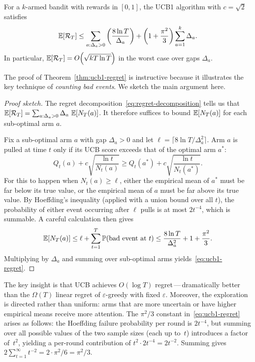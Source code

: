 \begin{theorem}
\label{thm:ucb1-regret}
For a $k$-armed bandit with rewards in $[0,1]$, the UCB1 algorithm with $c=\sqrt{2}$ satisfies
\begin{equation}
\label{eq:ucb1-regret}
\operatorname{\mathbb{E}}[\mathcal{R}_T] \le \sum_{a:\Delta_a>0}\left(\frac{8\ln T}{\Delta_a}\right) + \left(1+\frac{\pi^2}{3}\right)\sum_{a=1}^{k}\Delta_a.
\end{equation}
In particular, $\operatorname{\mathbb{E}}[\mathcal{R}_T]=O\!\left(\sqrt{kT\ln T}\right)$ in the worst case over gaps $\Delta_a$.
\end{theorem}

The proof of Theorem~\ref{thm:ucb1-regret} is instructive because it illustrates the key technique of \emph{counting bad events}.  We sketch the main argument here.

\begin{proof}[Proof sketch]
The regret decomposition~\eqref{eq:regret-decomposition} tells us that $\operatorname{\mathbb{E}}[\mathcal{R}_T]=\sum_{a:\Delta_a>0}\Delta_a\,\operatorname{\mathbb{E}}[N_T(a)]$.  It therefore suffices to bound $\operatorname{\mathbb{E}}[N_T(a)]$ for each sub-optimal arm $a$.

Fix a sub-optimal arm $a$ with gap $\Delta_a>0$ and let $\ell = \lceil 8\ln T/\Delta_a^2\rceil$.  Arm $a$ is pulled at time $t$ only if its UCB score exceeds that of the optimal arm $a^*$:
\[
Q_t(a) + c\sqrt{\frac{\ln t}{N_t(a)}} \ge Q_t(a^*) + c\sqrt{\frac{\ln t}{N_t(a^*)}}.
\]
For this to happen when $N_t(a)\ge \ell$, either the empirical mean of $a^*$ must be far below its true value, or the empirical mean of $a$ must be far above its true value.  By Hoeffding's inequality (applied with a union bound over all $t$), the probability of either event occurring after $\ell$ pulls is at most $2t^{-4}$, which is summable.  A careful calculation then gives
\[
\operatorname{\mathbb{E}}[N_T(a)] \le \ell + \sum_{t=1}^{T}\mathbb{P}(\text{bad event at }t) \le \frac{8\ln T}{\Delta_a^2} + 1 + \frac{\pi^2}{3}.
\]
Multiplying by $\Delta_a$ and summing over sub-optimal arms yields~\eqref{eq:ucb1-regret}.
\end{proof}

\begin{remark}
The key insight is that UCB achieves $O(\log T)$ regret\,---\,dramatically better than the $\Omega(T)$ linear regret of $\varepsilon$-greedy with fixed $\varepsilon$.  Moreover, the exploration is directed rather than uniform: arms that are more uncertain or have higher empirical means receive more attention.  The $\pi^2/3$ constant in~\eqref{eq:ucb1-regret} arises as follows: the Hoeffding failure probability per round is $2t^{-4}$, but summing over all possible values of the two sample sizes (each up to~$t$) introduces a factor of~$t^2$, yielding a per-round contribution of $t^2 \cdot 2t^{-4} = 2t^{-2}$.  Summing gives $2\sum_{t=1}^{\infty}t^{-2}=2\cdot\pi^2/6=\pi^2/3$.
\end{remark}


